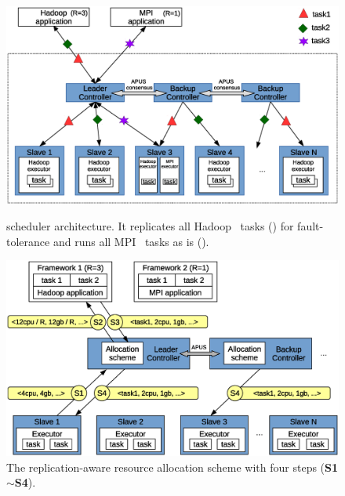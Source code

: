 \vspace{.1in}
\begin{figure}[!htb]
    \begin{minipage}{.48\textwidth}
        \vspace{-.3in}
        \includegraphics[width=0.34\textheight]{figures/scheduler_arch.eps}
         \vspace{-.4in}
        \caption{\tripod scheduler architecture. It replicates all 
Hadoop~\cite{hadoop} tasks () for fault-tolerance and runs all 
MPI~\cite{mpi} tasks as is ().}
        \label{fig:scheduler-arch}
    \end{minipage}
    \hspace{0.16in}
    \begin{minipage}{0.48\textwidth}
        \vspace{-.3in}
        \includegraphics[width=0.34\textheight]{figures/scheduler_flow.eps}
        \vspace{-.4in}
        \caption{The replication-aware resource allocation scheme with four 
steps (\textbf{S1}$\sim$\textbf{S4}).}
        \label{fig:scheduler-workflow}
    \end{minipage}
\end{figure}

